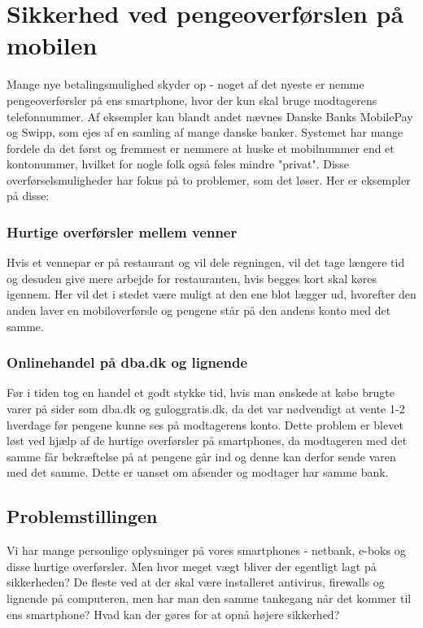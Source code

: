 \label{sec:projektforslag}
\section*{Sikkerhed ved pengeoverførslen på mobilen}

Mange nye betalingsmulighed skyder op - noget af det nyeste er nemme pengeoverførsler på ens smartphone, hvor der kun skal bruge modtagerens telefonnummer. Af eksempler kan blandt andet nævnes Danske Banks MobilePay og Swipp, som ejes af en samling af mange danske banker. Systemet har mange fordele da det først og fremmest er nemmere at huske et mobilnummer end et kontonummer, hvilket for nogle folk også føles mindre "privat". Disse overførselsmuligheder har fokus på to problemer, som det løser. Her er eksempler på disse:
\subsubsection*{Hurtige overførsler mellem venner}
Hvis et vennepar er på restaurant og vil dele regningen, vil det tage længere tid og desuden give mere arbejde for restauranten, hvis begges kort skal køres igennem. Her vil det i stedet være muligt at den ene blot lægger ud, hvorefter den anden laver en mobiloverførsle og pengene står på den andens konto med det samme. 

\subsubsection*{Onlinehandel på dba.dk og lignende}
Før i tiden tog en handel et godt stykke tid, hvis man ønskede at købe brugte varer på sider som dba.dk og guloggratis.dk, da det var nødvendigt at vente 1-2 hverdage før pengene kunne ses på modtagerens konto. Dette problem er blevet løst ved hjælp af de hurtige overførsler på smartphones, da modtageren med det samme får bekræftelse på at pengene går ind og denne kan derfor sende varen med det samme. Dette er uanset om afsender og modtager har samme bank.

\subsection*{Problemstillingen}
Vi har mange personlige oplysninger på vores smartphones - netbank, e-boks og disse hurtige overførsler. Men hvor meget vægt bliver der egentligt lagt på sikkerheden? De fleste ved at der skal være installeret antivirus, firewalls og lignende på computeren, men har man den samme tankegang når det kommer til ens smartphone? Hvad kan der gøres for at opnå højere sikkerhed?